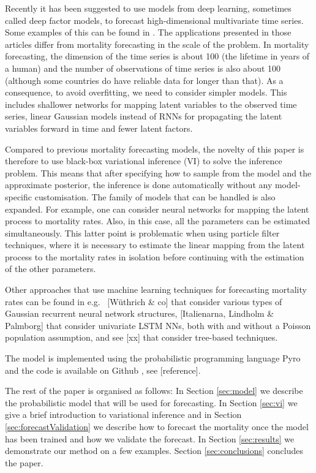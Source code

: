 \documentclass[preprint,12pt]{elsarticle}
\newcommand{\ml}[1]{{\color{red} #1}}
\newcommand{\lpa}[1]{{\color{blue} #1}}
\begin{document}
Recently it has been suggested to use models from deep learning, sometimes called deep factor models, to forecast high-dimensional multivariate time series. Some examples of this can be found in \cite{nguyen2021temporal, wang2019deep, salinas2020deepar, rangapuram2018deep}. The applications presented in those articles differ from mortality forecasting in the scale of the problem. In mortality forecasting, the dimension of the time series is about 100 (the lifetime in years of a human) and the number of observations of time series is also about 100 (although some countries do have reliable data for longer than that). As a consequence, to avoid overfitting, we need to consider simpler models. This includes shallower networks for mapping latent variables to the observed time series, linear Gaussian models instead of RNNs for propagating the latent variables forward in time and fewer latent factors.

Compared to previous mortality forecasting models, the novelty of this paper is therefore to use black-box variational inference (VI) \citep{ranganath2014black} to solve the inference problem. This means that after specifying how to sample from the model and the approximate posterior, the inference is done automatically without any model-specific customisation. The family of models that can be handled is also expanded. For example, one can consider neural networks for mapping the latent process to mortality rates. Also, in this case, all the parameters can be estimated simultaneously. This latter point is problematic when using particle filter techniques, where it is necessary to estimate the linear mapping from the latent process to the mortality rates in isolation before continuing with the estimation of the other parameters.

Other approaches that use machine learning techniques for forecasting mortality rates can be found in e.g.\ \ml{[W{\"u}thrich \& co]} that consider various types of Gaussian recurrent neural network structures, \ml{[Italienarna, Lindholm \& Palmborg]} that consider univariate LSTM NNs, both with and without a Poisson population assumption, and see \ml{[xx]} that consider tree-based techniques.

The model is implemented using the probabilistic programming language Pyro \citep{bingham2018pyro} and the code is available on Github\lpa{, see [reference]}.

The rest of the paper is organised as follows: In Section \ref{sec:model} we describe the probabilistic model that will be used for forecasting. In Section \ref{sec:vi} we give a brief introduction to variational inference and in Section \ref{sec:forecastValidation} we describe how to forecast the mortality once the model has been trained and how we validate the forecast. In Section \ref{sec:results} we demonstrate our method on a few examples. Section \ref{sec:conclusions} concludes the paper.
\end{document}
